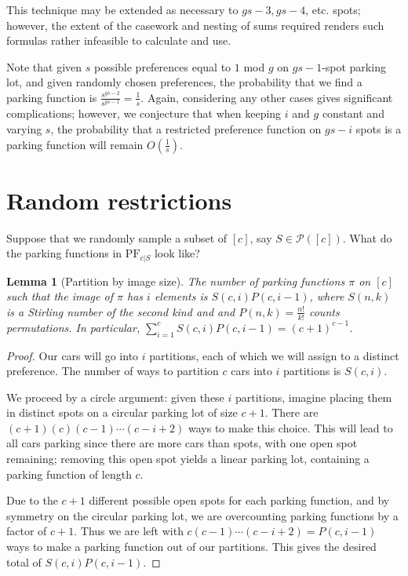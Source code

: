 \documentclass[12 pt]{amsart}
\newtheorem{lemma}[theorem]{Lemma}
\theoremstyle{definition} %
\theoremstyle{remark} %
\begin{document}
This technique may be extended as necessary to $gs-3,gs-4$, etc. spots; however, the extent of the casework and nesting of sums required renders such formulas rather infeasible to calculate and use.

Note that given $s$ possible preferences equal to $1$ mod $g$ on $gs-1$-spot parking lot, and given randomly chosen preferences, the probability that we find a parking function is $\frac{s^{gs-2}}{s^{gs-1}}=\frac{1}{s}$. Again, considering any other cases gives significant complications; however, we conjecture that when keeping $i$ and $g$ constant and varying $s$, the probability that a restricted preference function on $gs-i$ spots is a parking function will remain $O\left(\frac{1}{s}\right)$.

\section{Random restrictions} \label{s:rand-res}

Suppose that we randomly sample a subset of $[c]$, say $S \in \mathcal{P}([c])$. What do the parking functions in $\mathrm{PF}_{c|S}$ look like?

\begin{lemma}[Partition by image size]
    The number of parking functions $\pi$ on $[c]$ such that the image of $\pi$ has $i$ elements is $S(c,i)P(c,i-1)$, where $S(n,k)$ is a Stirling number of the second kind and and $P(n,k)=\frac{n!}{k!}$ counts permutations. In particular, $\displaystyle\sum_{i=1}^{c}S(c,i)P(c,i-1)=(c+1)^{c-1}$.
\end{lemma}

\begin{proof}
    Our cars will go into $i$ partitions, each of which we will assign to a distinct preference. The number of ways to partition $c$ cars into $i$ partitions is $S(c,i)$.

    We proceed by a circle argument: given these $i$ partitions, imagine placing them in distinct spots on a circular parking lot of size $c+1$. There are $(c+1)(c)(c-1)\cdots(c-i+2)$ ways to make this choice. This will lead to all cars parking since there are more cars than spots, with one open spot remaining; removing this open spot yields a linear parking lot, containing a parking function of length $c$.

    Due to the $c+1$ different possible open spots for each parking function, and by symmetry on the circular parking lot, we are overcounting parking functions by a factor of $c+1$. Thus we are left with $c(c-1)\cdots(c-i+2)=P(c,i-1)$ ways to make a parking function out of our partitions. This gives the desired total of $S(c,i)P(c,i-1)$.
\end{proof}
\end{document}
